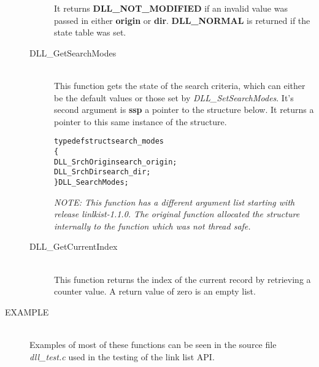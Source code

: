 \documentclass[10pt,letterpaper,titlepage]{article}
\begin{document}
\begin{description}
\begin{description}
 It returns \textbf{DLL\_NOT\_MODIFIED} if an invalid value was passed in either \textbf{origin} or \textbf{dir}.  \textbf{DLL\_NORMAL} is returned if the state table was set.

 \item[DLL\_GetSearchModes]\quad\\
 This function gets the state of the search criteria, which can either be the default values or those set by \emph{DLL\_SetSearchModes}.  It's second argument is \textbf{ssp} a pointer to the structure below.  It returns a pointer to this same instance of the structure.

 \begin{alltt}
typedef struct search_modes
   \{
   DLL_SrchOrigin search_origin;
   DLL_SrchDir    search_dir;
   \} DLL_SearchModes;
 \end{alltt}

\emph{NOTE: This function has a different argument list starting with release linlkist-1.1.0.  The original function allocated the structure internally to the function which was not thread safe.}

 \item[DLL\_GetCurrentIndex]\quad\\
 This function returns the index of the current record by retrieving a counter value.  A return value of zero is an empty list.
 \end{description}

\item[EXAMPLE]\quad\\
Examples of most of these functions can be seen in the source file \emph{dll\_test.c} used in the testing of the link list API.

\end{description}
\pagebreak
\end{document}
